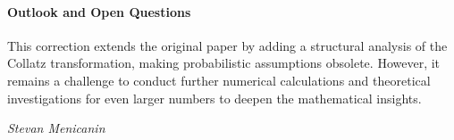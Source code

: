 \documentclass[a4paper,12pt]{article}
\begin{document}
\paragraph{Outlook and Open Questions}
This correction extends the original paper by adding a structural analysis of the Collatz transformation, making probabilistic assumptions obsolete. However, it remains a challenge to conduct further numerical calculations and theoretical investigations for even larger numbers to deepen the mathematical insights.

\vspace{1cm}
\begin{flushright}
\textit{Stevan Menicanin}
\end{flushright}




\newpage
\pagestyle{empty}  %
\clearpage
\end{document}
